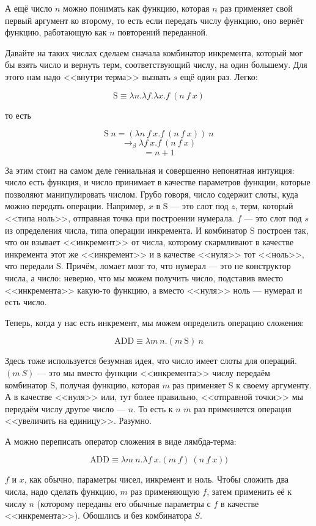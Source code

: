 \documentclass[a5paper]{article}
\begin{document}
А ещё число $n$ можно понимать как функцию, которая $n$ раз применяет свой первый аргумент ко второму, то есть если передать числу функцию, оно вернёт функцию, работающую как $n$ повторений переданной.

Давайте на таких числах сделаем сначала комбинатор инкремента, который мог бы взять число и вернуть терм, соответствующий числу, на один большему. Для этого нам надо <<внутри терма>> вызвать $s$ ещё один раз. Легко:

$$\mbox{S}\equiv \lambda n.\lambda f.\lambda x.f\ (n\ f\ x)$$

то есть

$$\mbox{S}\ n = (\lambda n\ f\ x.f\ (n\ f\ x))\ n$$
$$\rightarrow_\beta \lambda f\ x.f\ (n\ f\ x)$$
$$= n + 1$$

За этим стоит на самом деле гениальная и совершенно непонятная интуиция: число есть функция, и число принимает в качестве параметров функции, которые позволяют манипулировать числом. Грубо говоря, число содержит слоты, куда можно передать операции. Например, $x$ в S --- это слот под $z$, терм, который <<типа ноль>>, отправная точка при построении нумерала. $f$ --- это слот под $s$ из определения числа, типа операции инкремента. И комбинатор S построен так, что он взывает <<инкремент>> от числа, которому скармливают в качестве инкремента этот же <<инкремент>> и в качестве <<нуля>> тот <<ноль>>, что передали S. Причём, ломает мозг то, что нумерал --- это не конструктор числа, а число: неверно, что мы можем получить число, подставив вместо <<инкремента>> какую-то функцию, а вместо <<нуля>> ноль --- нумерал и есть число.

Теперь, когда у нас есть инкремент, мы можем определить операцию сложения:

$$\mbox{ADD} \equiv \lambda m\ n.(m\ \mbox{S})\ n$$

Здесь тоже используется безумная идея, что число имеет слоты для операций. $(m\ S)$ --- это мы вместо функции <<инкремента>> числу передаём комбинатор S, получая функцию, которая $m$ раз применяет S к своему аргументу. А в качестве <<нуля>> или, тут более правильно, <<отправной точки>> мы передаём числу другое число --- $n$. То есть к $n$ $m$ раз применяется операция <<увеличить на единицу>>. Разумно.

А можно переписать оператор сложения в виде лямбда-терма:

$$\mbox{ADD} \equiv \lambda m\ n.\lambda f\ x.(m\ f)\ (n\ f\ x))$$

$f$ и $x$, как обычно, параметры чисел, инкремент и ноль. Чтобы сложить два числа, надо сделать функцию, $m$ раз применяющую $f$, затем применить её к числу $n$ (которому переданы его обычные параметры с $f$ в качестве <<инкремента>>). Обошлись и без комбинатора $S$.
\end{document}
